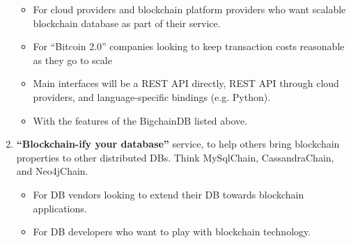 \begin{enumerate}
\begin{itemize}
  \item For cloud providers and blockchain platform providers who want scalable blockchain database as part of their service.
  \item For “Bitcoin 2.0” companies looking to keep transaction costs reasonable as they go to scale
  \item Main interfaces will be a REST API directly, REST API through cloud providers, and language-specific bindings (e.g. Python).
  \item With the features of the BigchainDB listed above.
 \end{itemize}
 \item \textbf{“Blockchain-ify your database”} service, to help others bring blockchain properties to other distributed DBs. Think MySqlChain, CassandraChain, and Neo4jChain.
 \begin{itemize}
  \item For DB vendors looking to extend their DB towards blockchain applications.
  \item For DB developers who want to play with blockchain technology.
 \end{itemize}
\end{enumerate}


